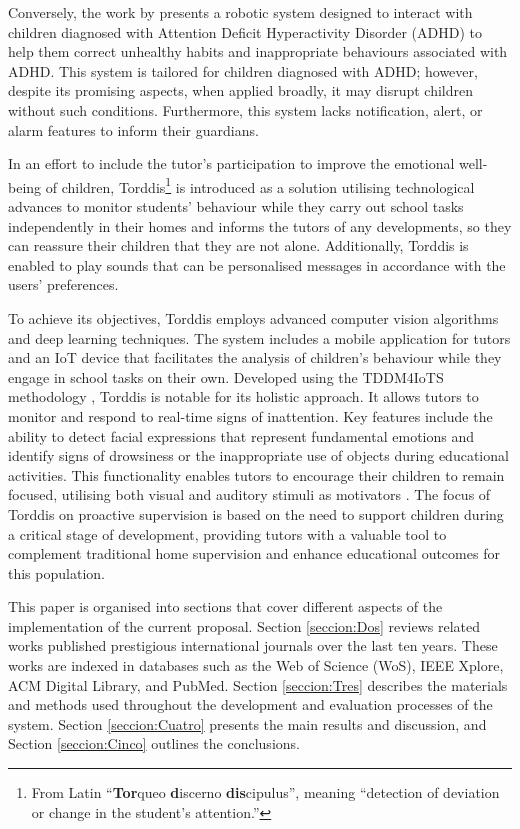 \documentclass[a4paper,fleqn]{cas-sc}
\begin{document}
		Conversely, the work by %
		\cite{Berrezueta-Guzman2021} presents a robotic system designed to interact with children diagnosed with Attention Deficit Hyperactivity Disorder (ADHD) to help them correct unhealthy habits and inappropriate behaviours associated with ADHD. This system is tailored for children diagnosed with ADHD; however, despite its promising aspects, when applied broadly, it may disrupt children without such conditions. Furthermore, this system lacks  notification, alert, or alarm features to inform their guardians.

		In an effort to include the tutor's participation to improve the emotional well-being of children, Torddis\footnote{From Latin ``\textbf{Tor}queo \textbf{d}iscerno \textbf{dis}cipulus'', meaning ``detection of deviation or change in the student's attention.''} is introduced as a solution utilising technological advances to monitor students' behaviour while they carry out school tasks independently in their homes and informs the tutors of any developments, so  they can reassure their children that they are not alone. Additionally, Torddis is enabled to play sounds that can be personalised messages in accordance with the users' preferences.

		To achieve its objectives, Torddis employs advanced computer vision algorithms and deep learning techniques. The system includes a mobile application for tutors and an IoT device that facilitates the analysis of children's behaviour while they engage in school tasks on their own. Developed using the TDDM4IoTS methodology \citep{Guerrero-Ulloa2020TDDM4IoTS}, Torddis is notable for its holistic approach. It allows tutors to monitor and respond to real-time signs of inattention. Key features include the ability to detect facial expressions that represent fundamental emotions and identify signs of drowsiness or the inappropriate use of objects during educational activities. This functionality enables tutors to encourage their children to remain focused, utilising both visual and auditory stimuli as motivators \citep{Al-Gburi2023,Enadula2021,Terraza2022}.
		The focus of Torddis on proactive supervision is based on the need to support children during a critical stage of development, providing tutors with a valuable tool to complement traditional home supervision and enhance educational outcomes for this population.

		This paper is organised into sections that cover different aspects of the implementation of the current proposal. Section \ref{seccion:Dos} reviews related works published prestigious international journals over the last ten years. These works are indexed in databases such as the Web of Science (WoS), IEEE Xplore, ACM Digital Library, and PubMed. Section \ref{seccion:Tres} describes the materials and methods used throughout the development and evaluation processes of the system. Section \ref{seccion:Cuatro} presents the main results and discussion, and Section \ref{seccion:Cinco} outlines the conclusions.
\end{document}
